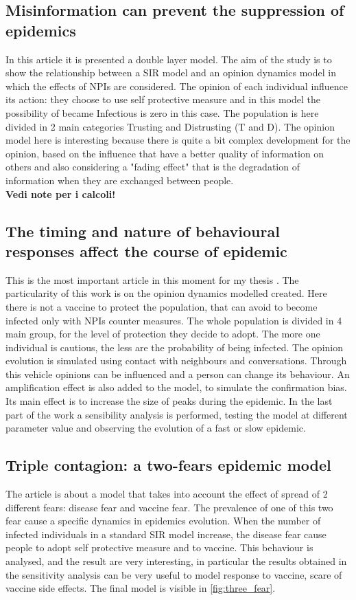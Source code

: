 \documentclass[a4paper,11pt]{scrartcl}
\begin{document}
	
	\subsection{Misinformation can prevent the suppression of epidemics}
	In this article \cite{Sontag2022} it is presented a double layer model. The aim of the study is to show the relationship between a SIR model and an opinion dynamics model in which the effects of NPIs are considered.
	The opinion of each individual influence its action: they choose to use self protective measure and in this model the possibility of became Infectious is zero in this case. The population is here divided in 2 main categories Trusting and Distrusting (T and D). The opinion model here is interesting because there is quite a bit complex development for the opinion, based on the influence that have a better quality of information on others and also considering a "fading effect" that is the degradation of information when they are exchanged between people. 
	\\
	\textbf{Vedi note per i calcoli!}
	
	\subsection{The timing and nature of behavioural responses affect the course of epidemic}
	This is the most important article in this moment for my thesis \cite{Tyson_2020}.  The particularity of this work is on the opinion dynamics modelled created. Here there is not a vaccine to protect the population, that can avoid to become infected only with NPIs counter measures. The whole population is divided in 4 main group, for the level of protection they decide to adopt. The more one individual is cautious, the less are the probability of being infected.  
	The opinion evolution is simulated using contact with neighbours and conversations. Through this vehicle opinions can be influenced and a person can change its behaviour. 
	An amplification effect is also added to the model, to simulate the confirmation bias. Its main effect is to increase the size of peaks during the epidemic. 
	In the last part of the work a sensibility analysis is performed, testing the model at different parameter value and observing the evolution of a fast or slow epidemic. 
	
	\subsection{Triple contagion: a two-fears epidemic model}
	The article \cite{Epstein2021} is about a model that takes into account the effect of spread of 2 different fears: disease fear and vaccine fear. 
	The prevalence of one of this two fear cause a specific dynamics in epidemics evolution. 
	When the number of infected individuals in a standard SIR model increase, the disease fear cause people to adopt self protective measure and to vaccine. 
	This behaviour is analysed, and the result are very interesting, in particular the results obtained in the sensitivity analysis can be very useful to model response to vaccine, scare of vaccine side effects. The final model is visible in \ref{fig:three_fear}.
	
\end{document}
